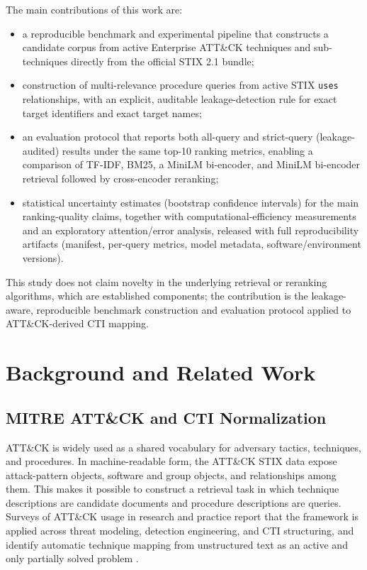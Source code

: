 \documentclass[conference]{IEEEtran}
\begin{document}
The main contributions of this work are:
\begin{itemize}
\item a reproducible benchmark and experimental pipeline that constructs a candidate corpus from active Enterprise ATT\&CK techniques and sub-techniques directly from the official STIX 2.1 bundle;
\item construction of multi-relevance procedure queries from active STIX \texttt{uses} relationships, with an explicit, auditable leakage-detection rule for exact target identifiers and exact target names;
\item an evaluation protocol that reports both all-query and strict-query (leakage-audited) results under the same top-10 ranking metrics, enabling a comparison of TF-IDF, BM25, a MiniLM bi-encoder, and MiniLM bi-encoder retrieval followed by cross-encoder reranking;
\item statistical uncertainty estimates (bootstrap confidence intervals) for the main ranking-quality claims, together with computational-efficiency measurements and an exploratory attention/error analysis, released with full reproducibility artifacts (manifest, per-query metrics, model metadata, software/environment versions).
\end{itemize}
This study does not claim novelty in the underlying retrieval or reranking algorithms, which are established components; the contribution is the leakage-aware, reproducible benchmark construction and evaluation protocol applied to ATT\&CK-derived CTI mapping.

\section{Background and Related Work}
\subsection{MITRE ATT\&CK and CTI Normalization}
ATT\&CK is widely used as a shared vocabulary for adversary tactics, techniques, and procedures. In machine-readable form, the ATT\&CK STIX data expose attack-pattern objects, software and group objects, and relationships among them. This makes it possible to construct a retrieval task in which technique descriptions are candidate documents and procedure descriptions are queries. Surveys of ATT\&CK usage in research and practice report that the framework is applied across threat modeling, detection engineering, and CTI structuring, and identify automatic technique mapping from unstructured text as an active and only partially solved problem \cite{roy2023sok}.
\end{document}
